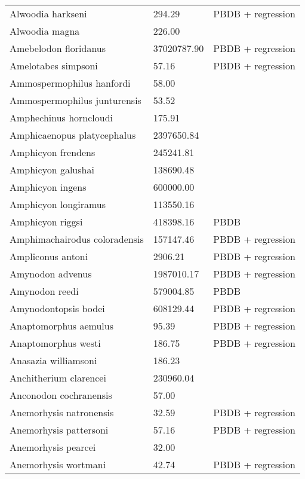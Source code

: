 \documentclass{article}
\begin{document}
\begin{center}
\begin{longtable}{p{} p{} p{} }
  Alwoodia harkseni & 294.29 & PBDB + regression \\ 
  Alwoodia magna & 226.00 & \cite{McKenna2011} \\ 
  Amebelodon floridanus & 37020787.90 & PBDB + regression \\ 
  Amelotabes simpsoni & 57.16 & PBDB + regression \\ 
  Ammospermophilus hanfordi & 58.00 & \cite{McKenna2011} \\ 
  Ammospermophilus junturensis & 53.52 & \cite{Tomiya2013} \\ 
  Amphechinus horncloudi & 175.91 & \cite{Tomiya2013} \\ 
  Amphicaenopus platycephalus & 2397650.84 & \cite{Tomiya2013} \\ 
  Amphicyon frendens & 245241.81 & \cite{Tomiya2013} \\ 
  Amphicyon galushai & 138690.48 & \cite{Tomiya2013} \\ 
  Amphicyon ingens & 600000.00 & \cite{Sorkin2008} \\ 
  Amphicyon longiramus & 113550.16 & \cite{Tomiya2013} \\ 
  Amphicyon riggsi & 418398.16 & PBDB \\ 
  Amphimachairodus coloradensis & 157147.46 & PBDB + regression \\ 
  Ampliconus antoni & 2906.21 & PBDB + regression \\ 
  Amynodon advenus & 1987010.17 & PBDB + regression \\ 
  Amynodon reedi & 579004.85 & PBDB \\ 
  Amynodontopsis bodei & 608129.44 & PBDB + regression \\ 
  Anaptomorphus aemulus & 95.39 & PBDB + regression \\ 
  Anaptomorphus westi & 186.75 & PBDB + regression \\ 
  Anasazia williamsoni & 186.23 & \cite{Williamson2012} \\ 
  Anchitherium clarencei & 230960.04 & \cite{Tomiya2013} \\ 
  Anconodon cochranensis & 57.00 & \cite{Wilson2012} \\ 
  Anemorhysis natronensis & 32.59 & PBDB + regression \\ 
  Anemorhysis pattersoni & 57.16 & PBDB + regression \\ 
  Anemorhysis pearcei & 32.00 & \cite{Albright2000} \\ 
  Anemorhysis wortmani & 42.74 & PBDB + regression \\ 

\end{longtable}
\end{center}
\end{document}
